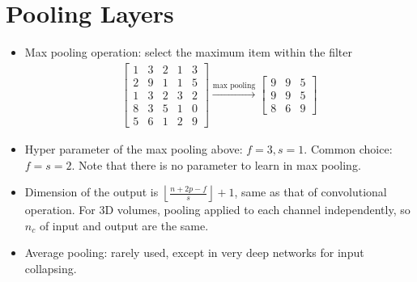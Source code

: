 \section{Pooling Layers}
\begin{itemize}
  \item Max pooling operation: select the maximum item within the filter
  \begin{align*}
    \begin{bmatrix}
      1 & 3 & 2 & 1 & 3\\ 
      2 & 9 & 1 & 1 & 5\\
      1 & 3 & 2 & 3 & 2\\
      8 & 3 & 5 & 1 & 0\\
      5 & 6 & 1 & 2 & 9
    \end{bmatrix}\xrightarrow{\text{max pooling}}
    \begin{bmatrix}
      9 & 9 & 5\\
      9 & 9 & 5\\
      8 & 6 & 9
    \end{bmatrix}
  \end{align*}
  \item Hyper parameter of the max pooling above: $f=3, s=1$. Common choice: $f=s=2$. Note that there is no parameter to learn in max pooling. 
  \item Dimension of the output is $\left\lfloor\frac{n+2p-f}{s}\right\rfloor+1$, same as that of convolutional operation. For 3D volumes, pooling applied to each channel independently, so $n_c$ of input and output are the same.
  \item Average pooling: rarely used, except in very deep networks for input collapsing.
\end{itemize}
